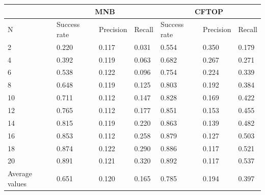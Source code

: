 \begin{table}[h]
\centering
\footnotesize
\begin{tabular}{|l|l|l|l|l|l|l|}
\hline
  & \multicolumn{3}{c|}{MNB}          & \multicolumn{3}{c|}{CFTOP}        \\ \hline
N & Success rate & Precision & Recall & Success rate & Precision & Recall \\ \hline
2  &       0.220       &    0.117       &  0.031       &     0.554         &      0.350     &   0.179      \\ \hline
 4 &     0.392         &    0.119       &     0.063   &       0.682       &       0.267    &   0.271     \\ \hline
6 &    0.538          &      0.122	     &   0.096     &     0.754         &    0.224       &   0.339     \\ \hline
8 &    0.648          &  0.119         &   0.125      &         0.803     &     0.192      &   0.384     \\ \hline
10 &      0.711        &    0.112       &   0.147     &      0.828        &   0.169        &    0.422    \\ \hline
12 &     0.765         &      0.112     &   0.177     &        0.851      &     0.153      &     0.455   \\ \hline
14 &      0.815        &    0.119       &   0.220     &    0.863          &   0.139         &   0.482     \\ \hline
16 &       0.853       &     0.112      &     0.258   &        0.879      &   0.127        &   0.503     \\ \hline
18 &      0.874        &     0.122      &     0.290   &       0.886       &     0.117      &    0.521    \\ \hline
20 &     0.891         &    0.121       &    0.320    &      0.892        &   0.117        &       0.537 \\ \hline
Average values &     0.651        &    0.120       &    0.165   &      0.785        &   0.194        &       0.397  \\ \hline












\end{tabular}
\end{table} 


